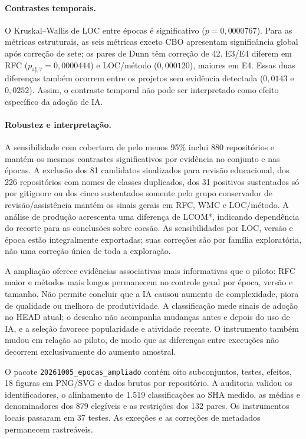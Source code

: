 \paragraph{Contrastes temporais.}
O Kruskal--Wallis de LOC entre épocas é significativo ($p=0,0000767$). Para as métricas estruturais, as seis métricas exceto CBO apresentam significância global após correção de sete; os pares de Dunn têm correção de 42. E3/E4 diferem em RFC ($p_{\mathrm{aj},7}=0,0000444$) e LOC/método ($0,000120$), maiores em E4. Essas duas diferenças também ocorrem entre os projetos sem evidência detectada ($0,0143$ e $0,0252$). Assim, o contraste temporal não pode ser interpretado como efeito específico da adoção de IA.

\paragraph{Robustez e interpretação.}
A sensibilidade com cobertura de pelo menos 95\% inclui 880 repositórios e mantém os mesmos contrastes significativos por evidência no conjunto e nas épocas. A exclusão dos 81 candidatos sinalizados para revisão educacional, dos 226 repositórios com nomes de classes duplicados, dos 31 positivos sustentados só por gitignore ou dos cinco sustentados somente pelo grupo conservador de revisão/assistência mantém os sinais gerais em RFC, WMC e LOC/método. A análise de produção acrescenta uma diferença de LCOM*, indicando dependência do recorte para as conclusões sobre coesão. As sensibilidades por LOC, versão e época estão integralmente exportadas; suas correções são por família exploratória, não uma correção única de toda a exploração.

A ampliação oferece evidências associativas mais informativas que o piloto: RFC maior e métodos mais longos permanecem no controle geral por época, versão e tamanho. Não permite concluir que a IA causou aumento de complexidade, piora de qualidade ou melhora de produtividade. A classificação mede sinais de adoção no HEAD atual; o desenho não acompanha mudanças antes e depois do uso de IA, e a seleção favorece popularidade e atividade recente. O instrumento também mudou em relação ao piloto, de modo que as diferenças entre execuções não decorrem exclusivamente do aumento amostral.

O pacote \texttt{20261005\_epocas\_ampliado} contém oito subconjuntos, testes, efeitos, 18 figuras em PNG/SVG e dados brutos por repositório. A auditoria validou os identificadores, o alinhamento de 1.519 classificações ao SHA medido, as médias e denominadores dos 879 elegíveis e as restrições dos 132 pares. Os instrumentos locais passaram em 37 testes. As exceções e as correções de metadados permanecem rastreáveis.
